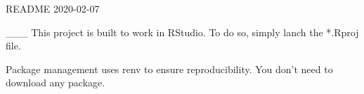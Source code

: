 README                                                               2020-02-07

___
This project is built to work in RStudio. To do so, simply lanch the *.Rproj 
file.

Package management uses renv to ensure reproducibility. You don't need to 
download any package.
